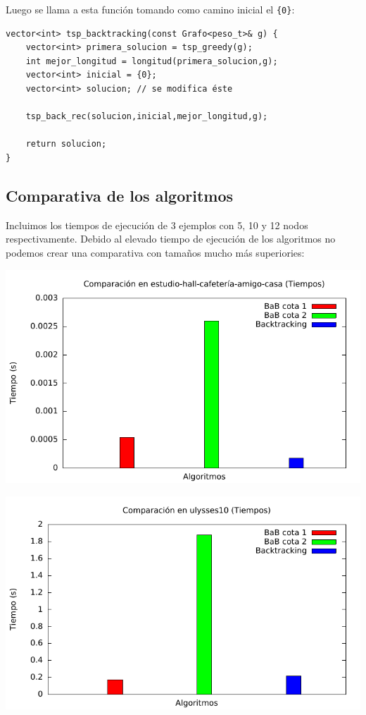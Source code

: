 Luego se llama a esta función tomando como camino inicial el \texttt{\{0\}}:

\begin{lstlisting}
vector<int> tsp_backtracking(const Grafo<peso_t>& g) {
	vector<int> primera_solucion = tsp_greedy(g);
	int mejor_longitud = longitud(primera_solucion,g);
	vector<int> inicial = {0};
	vector<int> solucion; // se modifica éste

	tsp_back_rec(solucion,inicial,mejor_longitud,g);

	return solucion;
}
\end{lstlisting}

\subsection{Comparativa de los algoritmos}

Incluimos los tiempos de ejecución de 3 ejemplos con 5, 10 y 12 nodos respectivamente. Debido al elevado tiempo de ejecución de los algoritmos no podemos crear una comparativa con tamaños mucho más superiories:

\includegraphics[width=15cm]{img/barras_e-h-c-a-c5_t}

\includegraphics[width=15cm]{img/barras_ulysses10_t}

